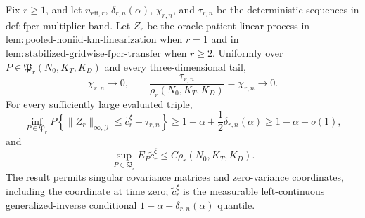 Fix \(r\ge1\), and let \(n_{\mathrm{eff},r}\), \(\delta_{r,n}(\alpha)\), \(\chi_{r,n}\), and \(\tau_{r,n}\) be the deterministic sequences in \(\mathrm{def:fpcr\mbox{-}multiplier\mbox{-}band}\). Let \(Z_r\) be the oracle patient linear process in \(\mathrm{lem:pooled\mbox{-}noniid\mbox{-}km\mbox{-}linearization}\) when \(r=1\) and in \(\mathrm{lem:stabilized\mbox{-}gridwise\mbox{-}fpcr\mbox{-}transfer}\) when \(r\ge2\). Uniformly over \(P\in\mathfrak P_r(N_0,K_T,K_D)\) and every three-dimensional tail,
\[
 \chi_{r,n}\longrightarrow0,
 \qquad
 \frac{\tau_{r,n}}{\rho_r(N_0,K_T,K_D)}=\chi_{r,n}\longrightarrow0.
\]
For every sufficiently large evaluated triple,
\[
 \inf_{P\in\mathfrak P_r}
 P\left\{\|Z_r\|_{\infty,\mathcal G}
 \le \widetilde c_r^\xi+\tau_{r,n}\right\}
 \ge 1-\alpha+\frac12\delta_{r,n}(\alpha)
 \ge1-\alpha-o(1),
\]
and
\[
 \sup_{P\in\mathfrak P_r}E_P\widetilde c_r^\xi
 \le C\rho_r(N_0,K_T,K_D).
\]
The result permits singular covariance matrices and zero-variance coordinates, including the coordinate at time zero; \(\widetilde c_r^\xi\) is the measurable left-continuous generalized-inverse conditional \(1-\alpha+\delta_{r,n}(\alpha)\) quantile.